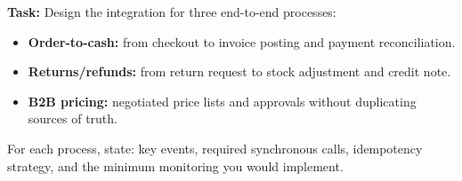 \textbf{Task:} Design the integration for three end-to-end processes:
\begin{itemize}
  \item \textbf{Order-to-cash:} from checkout to invoice posting and payment reconciliation.
  \item \textbf{Returns/refunds:} from return request to stock adjustment and credit note.
  \item \textbf{B2B pricing:} negotiated price lists and approvals without duplicating sources of truth.
\end{itemize}
For each process, state: key events, required synchronous calls, idempotency strategy, and the minimum monitoring you would implement.
